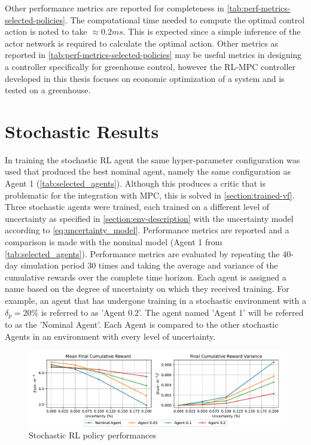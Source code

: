 Other performance metrics are reported for completeness in \autoref{tab:perf-metrics-selected-policies}. The computational time needed to compute the optimal control action is noted to take $\approx 0.2ms$. This is expected since a simple inference of the actor network is required to calculate the optimal action. Other metrics as reported in \autoref{tab:perf-metrics-selected-policies} may be useful metrics in designing a controller specifically for greenhouse control, however the RL-MPC controller developed in this thesis focuses on economic optimization of a system and is tested on a greenhouse.
 
\section{Stochastic Results} \label{section:rl-stochastic-results}
In training the stochastic RL agent the same hyper-parameter configuration was used that produced the best nominal agent, namely the same configuration as Agent 1 (\autoref{tab:selected_agents}). Although this produces a critic that is problematic for the integration with MPC, this is solved in \autoref{section:trained-vf}. Three stochastic agents were trained, each trained on a different level of uncertainty as specified in \autoref{section:env-description} with the uncertainty model according to \autoref{eq:uncertainty_model}. Performance metrics are reported and a comparison is made with the nominal model (Agent 1 from \autoref{tab:selected_agents}). Performance metrics are evaluated by repeating the 40-day simulation period 30 times and taking the average and variance of the cumulative rewards over the complete time horizon.
Each agent is assigned a name based on the degree of uncertainty on which they received training. For example, an agent that has undergone training in a stochastic environment with a $\delta_p= 20\%$ is referred to as 'Agent 0.2'. The agent named 'Agent 1' will be referred to as the 'Nominal Agent'. Each Agent is compared to the other stochastic Agents in an environment with every level of uncertainty.

\begin{figure}[H]
    \centering
    \includegraphics[width = \textwidth]{figures/stochastic_rl_policies.pdf}
    \caption{Stochastic RL policy performances}
    \label{fig:stochastic-rl-policies}
\end{figure}

